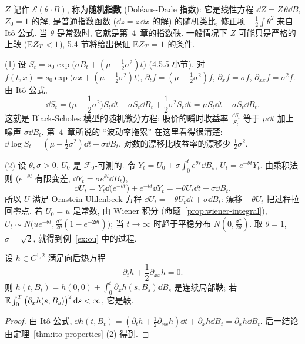 $Z$ 记作 $\mathscr{E}(\theta\cdot B)$, 称为\textbf{随机指数} (Dol\'eans-Dade 指数): 它是线性方程 $\dd Z=Z\,\theta\dd B$, $Z_0=1$ 的解, 是普通指数函数 ($\dd z=z\,\dd x$ 的解) 的随机类比, 修正项 $-\frac{1}{2}\int\theta^2$ 来自 It\^o 公式. 当 $\theta$ 是常数时, 它就是第~4~章的指数鞅. 一般情况下 $Z$ 可能只是严格的上鞅 ($\mathbb{E} Z_T<1$), 5.4 节将给出保证 $\mathbb{E} Z_T=1$ 的条件.

\begin{example}\label{ex:gbm-ou}
(1) 设 $S_t=s_0\exp\big(\sigma B_t+(\mu-\frac{1}{2}\sigma^2)t\big)$ (4.5.5 小节). 对 $f(t,x)=s_0\exp\big(\sigma x+(\mu-\frac{1}{2}\sigma^2)t\big)$, $\partial_tf=(\mu-\frac{1}{2}\sigma^2)f$, $\partial_xf=\sigma f$, $\partial_{xx}f=\sigma^2f$. 由 It\^o 公式,
\[
\dd S_t=\Big(\mu-\frac{1}{2}\sigma^2\Big)S_t\dd t+\sigma S_t\dd B_t+\frac{1}{2}\sigma^2S_t\dd t=\mu S_t\dd t+\sigma S_t\dd B_t.
\]
这就是 Black-Scholes 模型的随机微分方程: 股价的瞬时收益率 $\frac{\dd S_t}{S_t}$ 等于 $\mu\dd t$ 加上噪声 $\sigma\dd B_t$. 第~4~章所说的 ``波动率拖累'' 在这里看得很清楚: $\dd\log S_t=(\mu-\frac{1}{2}\sigma^2)\dd t+\sigma\dd B_t$, 对数的漂移比收益率的漂移少 $\frac{1}{2}\sigma^2$.

(2) 设 $\theta,\sigma>0$, $U_0$ 是 $\mathcal{F}_0$-可测的. 令 $Y_t=U_0+\sigma\int_0^te^{\theta s}\dd B_s$, $U_t=e^{-\theta t}Y_t$. 由乘积法则 ($e^{-\theta t}$ 有限变差, $\dd Y_t=\sigma e^{\theta t}\dd B_t$),
\[
\dd U_t=Y_t\dd\big(e^{-\theta t}\big)+e^{-\theta t}\dd Y_t=-\theta U_t\dd t+\sigma\dd B_t.
\]
所以 $U$ 满足 Ornstein-Uhlenbeck 方程 $\dd U_t=-\theta U_t\dd t+\sigma\dd B_t$: 漂移 $-\theta U_t$ 把过程拉回零点. 若 $U_0=u$ 是常数, 由 Wiener 积分 (命题~\ref{prop:wiener-integral}), $U_t\sim N\big(ue^{-\theta t},\frac{\sigma^2}{2\theta}(1-e^{-2\theta t})\big)$; 当 $t\to\infty$ 时趋于平稳分布 $N(0,\frac{\sigma^2}{2\theta})$. 取 $\theta=1$, $\sigma=\sqrt{2}$, 就得到例~\ref{ex:ou} 中的过程.
\end{example}

\begin{proposition}[时空调和函数与鞅]\label{prop:space-time-harmonic}
设 $h\in C^{1,2}$ 满足向后热方程
\[
\partial_th+\frac{1}{2}\partial_{xx}h=0.
\]
则 $h(t,B_t)=h(0,0)+\int_0^t\partial_xh(s,B_s)\dd B_s$ 是连续局部鞅; 若 $\mathbb{E}\int_0^T\big(\partial_xh(s,B_s)\big)^2\mathop{}\!\mathrm{d} s<\infty$, 它是鞅.
\end{proposition}

\begin{proof}
由 It\^o 公式, $\dd h(t,B_t)=(\partial_th+\frac{1}{2}\partial_{xx}h)\dd t+\partial_xh\dd B_t=\partial_xh\dd B_t$. 后一结论由定理~\ref{thm:ito-properties} (2) 得到.
\end{proof}

